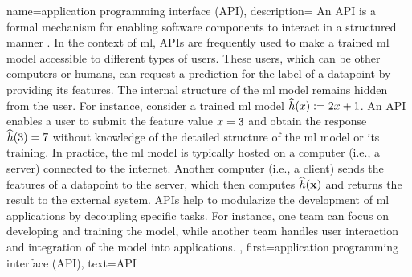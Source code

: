 {name={application programming interface (API)},
		description={
			An  API is a formal mechanism for enabling 
			software components to interact in a structured manner \cite{RestfulBook2013}. In the 
			context of \gls{ml}, APIs are frequently used to make a trained \gls{ml} \gls{model} 
			accessible to different types of users. These users, which can be other computers 
			or humans, can request a \gls{prediction} for the \gls{label} of a \gls{datapoint} by 
			providing its \gls{feature}s. The internal structure of the \gls{ml} 
			\gls{model} remains hidden from the user. For instance, consider a trained \gls{ml} \gls{model}  
			$\widehat{h}(x) :=  2 x+1$. An API enables a user to 
			submit the \gls{feature} value $x=3$ and obtain the response $\widehat{h}(3)=7$ 
			without knowledge of the detailed structure of the \gls{ml} \gls{model} or its training. 
			In practice, the \gls{ml} \gls{model} is typically hosted on a computer (i.e., a server) connected to the internet. 
			Another computer (i.e., a client) sends the \gls{feature}s of a \gls{datapoint} to the 
			server, which then computes $\widehat{h}({\bf x})$ and returns the 
			result to the external system. APIs help to modularize the development of 
			\gls{ml} applications by decoupling specific tasks. For instance, one team can 
			focus on developing and training the \gls{model}, while another team handles 
			user interaction and integration of the \gls{model} into applications.
			},
		first={application programming interface (API)},
		text={API}
}





	
